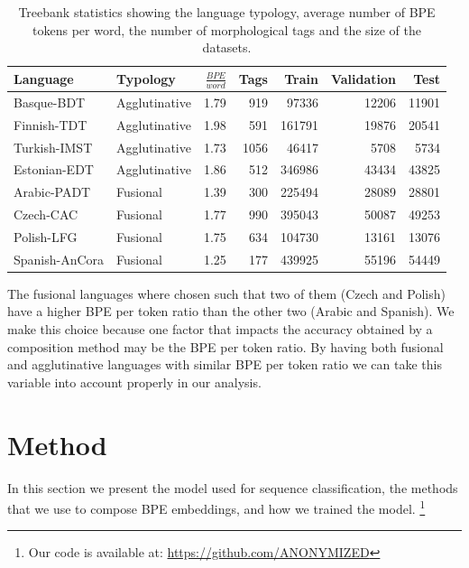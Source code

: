 \documentclass[11pt]{article}
\newcommand\jp[1]{(\textbf{JP:} #1)}
\begin{document}

    
    
    	\begin{table} %
		\centering
		\begin{tabular}{l|lrrrrr}
			Language & Typology & $\frac{BPE}{word}$ & Tags & Train & Validation & Test \\
			\hline
			Basque-BDT      & Agglutinative & 1.79 & 919 & 97336 & 12206 & 11901 \\
			Finnish-TDT     & Agglutinative & 1.98 & 591 & 161791 & 19876 & 20541 \\
			Turkish-IMST    & Agglutinative & 1.73 & 1056 & 46417 & 5708 & 5734 \\
			Estonian-EDT    & Agglutinative & 1.86 & 512 & 346986 & 43434 & 43825 \\
            Arabic-PADT     & Fusional & 1.39 & 300 & 225494 & 28089 & 28801  \\
			Czech-CAC       & Fusional & 1.77 & 990 & 395043 & 50087 & 49253 \\
			Polish-LFG      & Fusional & 1.75 & 634 & 104730 & 13161 & 13076 \\
			Spanish-AnCora  & Fusional & 1.25 & 177 & 439925 & 55196 & 54449 \\
        \end{tabular}
		\caption{\label{tab:data} Treebank statistics showing the language typology, average number of BPE tokens per word, the number of morphological tags and the size of the datasets.}
	\end{table}
    
        The fusional languages where chosen such that two of them
        (Czech and Polish) have a higher BPE per token ratio than the
        other two (Arabic and Spanish). We make this choice because
        one factor that impacts the accuracy obtained by a composition
        method may be the BPE per token ratio.  By having both
        fusional and agglutinative languages with similar BPE per
        token ratio we can take this variable into account properly in
        our analysis.

	\section{Method}
	\label{method}
    	In this section we present the model used for sequence
     classification, the methods that we use to compose BPE
     embeddings, and how we trained the model. \footnote{Our code is
     available at: \url{https://github.com/ANONYMIZED}}
\end{document}
